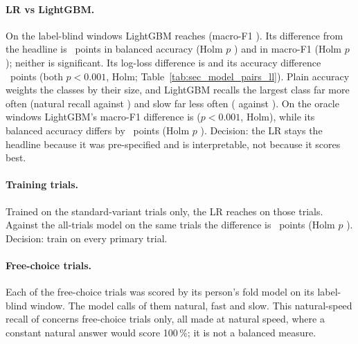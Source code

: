 \paragraph{LR vs LightGBM.} On the label-blind windows LightGBM reaches  (macro-F1
). Its difference from the headline is
~points in balanced accuracy (Holm $p$
) and
 in macro-F1 (Holm $p$
); neither is significant. Its log-loss difference is
 and its accuracy difference
~points (both $p < 0.001$, Holm;
Table~\ref{tab:sec_model_pairs_ll}). Plain accuracy weights the classes by their size, and LightGBM recalls the
largest class far more often (natural recall  against
) and slow far less often ( against
). On the oracle windows LightGBM's macro-F1 difference is
 ($p < 0.001$, Holm), while its balanced accuracy differs by
~points (Holm $p$ ).
Decision: the LR stays the headline because it was pre-specified and is interpretable, not because it scores
best.

\paragraph{Training trials.} Trained on the standard-variant trials only, the LR reaches
 on those trials. Against the all-trials model on the same
 trials the difference is
~points (Holm $p$
). Decision: train on every primary trial.

\paragraph{Free-choice trials.} Each of the  free-choice trials was scored by its
person's fold model on its label-blind window. The model calls  of them
natural,  fast and  slow. This natural-speed
recall of  concerns free-choice trials only, all made at natural speed,
where a constant natural answer would score 100\,\%; it is not a balanced measure.

